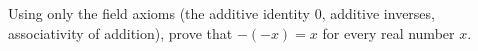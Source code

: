 Using only the field axioms (the additive identity $0$, additive inverses, associativity of addition), prove that $-(-x)=x$ for every real number $x$.
